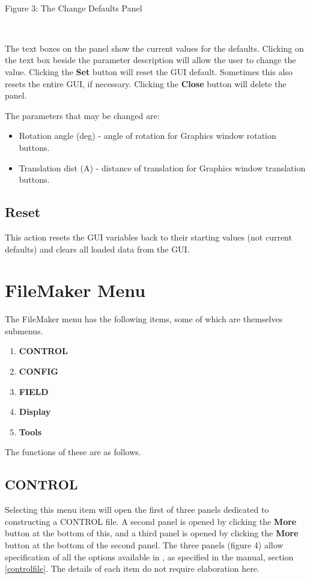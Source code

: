 ~

\vskip 5mm
\centerline{}
\centerline{Figure 3: The Change Defaults Panel}
\vskip 5mm

~

\noindent
The text boxes on the panel show the current values for the defaults.
Clicking on the text box beside the parameter description will allow
the user to change the value. Clicking the {\bf Set} button will reset
the GUI default. Sometimes this also resets the entire GUI, if necessary.
Clicking the {\bf Close} button will delete the panel.

The parameters that may be changed are:
\begin{itemize}
\item Rotation angle (deg) - angle of rotation for Graphics window
rotation buttons.
\item Translation dist (A) - distance of translation for Graphics
window translation buttons.
\end{itemize}

\subsection{Reset}

This action resets the GUI variables back to their starting values
(not current defaults) and clears all loaded data from the GUI.

\section{FileMaker Menu}

The FileMaker menu has the following items, some of which are
themselves submenus.
\begin{enumerate}
\item {\bf CONTROL}
\item {\bf CONFIG}
\item {\bf FIELD}
\item {\bf Display}
\item {\bf Tools}
\end{enumerate}
The functions of these are as follows.

\subsection{CONTROL}

Selecting this menu item will open the first of three panels dedicated
to constructing a \DD{} CONTROL file. A second panel is opened by
clicking the {\bf More} button at the bottom of this, and a third
panel is opened by clicking the {\bf More} button at the bottom of the
second panel. The three panels (figure 4) allow specification of all
the options available in \DD{}, as specified in the \DD{} manual, section
\ref{controlfile}. The details of each item do not require elaboration here.

